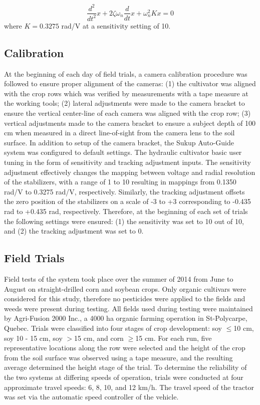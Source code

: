 \documentclass[authoryear]{elsarticle}
\begin{document}
\begin{equation}
  \frac{d^2}{dt^2}x + 2\zeta\omega_{n}\frac{d}{dt}x + \omega_{n}^2 Kx = 0 
  \label{eq:v_out}
\end{equation}
where $K=0.3275$ rad/V at a sensitivity setting of 10.

\subsection{Calibration}
At the beginning of each day of field trials, a camera calibration
procedure was followed to ensure proper alignment of the cameras: (1)
the cultivator was aligned with the crop rows which was verified by
measurements with a tape measure at the working tools; (2) lateral
adjustments were made to the camera bracket to ensure the vertical
center-line of each camera was aligned with the crop row; (3) vertical
adjustments made to the camera bracket to ensure a subject depth of
100 cm when measured in a direct line-of-sight from the camera lens to
the soil surface. In addition to setup of the camera bracket, the
Sukup Auto-Guide system was configured to default settings. The
hydraulic cultivator
basic user tuning in the form of sensitivity and tracking adjustment
inputs. The sensitivity adjustment effectively changes the mapping
between voltage and radial resolution of the stabilizers, with a range
of 1 to 10 resulting in mappings from 0.1350 rad/V to 0.3275 rad/V,
respectively. Similarly, the tracking adjustment offsets the zero
position of the stabilizers on a scale of -3 to +3 corresponding to
-0.435 rad to +0.435 rad, respectively. Therefore, at the beginning of
each set of trials the following settings were ensured: (1) the
sensitivity was set to 10 out of 10, and (2) the tracking adjustment
was set to 0.

\subsection{Field Trials}
Field tests of the system took place over the summer of 2014 from June
to August on straight-drilled corn and soybean crops. Only organic
cultivars were considered for this study, therefore no pesticides were
applied to the fields and weeds were present during testing. All
fields used during testing were maintained by Agri-Fusion 2000 Inc., a
4000 ha organic farming operation in St-Polycarpe, Quebec. Trials were
classified into four stages of crop development: soy $\le$10 cm, soy 10 - 15
cm, soy $>$15 cm, and corn $\ge$15 cm. For each run, five representative
locations along the row were selected and the height of the crop from
the soil surface was observed using a tape measure, and the resulting
average determined the height stage of the trial. To determine the
reliability of the two systems at differing speeds of operation,
trials were conducted at four approximate travel speeds: 6, 8, 10, and
12 km/h. The travel speed of the tractor was set via the automatic
speed controller of the vehicle.
\end{document}
